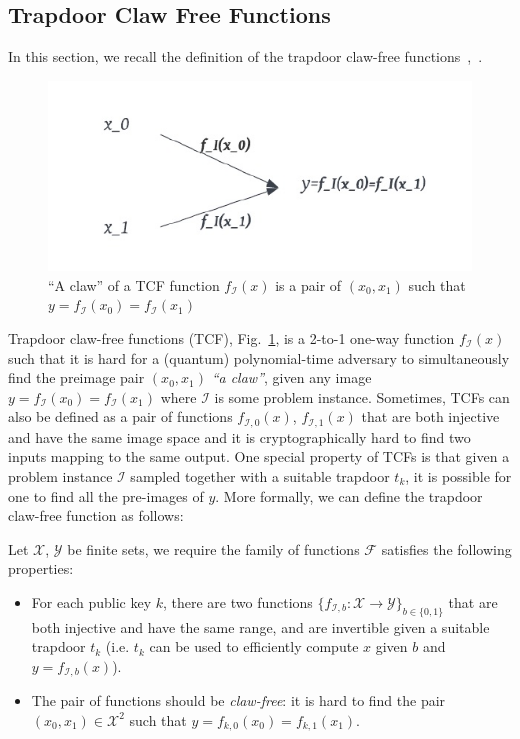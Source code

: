 \documentclass[cryptography,review,submit,pdftex,moreauthors,amsmath,amssymb,aps,strict]{Definitions/mdpi}
\begin{document}
\subsection{Trapdoor Claw Free Functions}

In this section, we recall the definition of the trapdoor claw-free functions~\cite{GRM85},~\cite{Brakerski18_Interactiveproofofquantumness}.

\begin{figure}[!htb]
	\centering
	\includegraphics[]{figures/TCF.pdf}
	\caption{``A claw'' of a TCF function $f_{\mathcal{I}}(x)$ is a pair of $(x_0,x_1)$ such that $y=f_{\mathcal{I}}(x_0)=f_{\mathcal{I}}(x_1)$}\label{fig:TCF}
\end{figure}


Trapdoor claw-free functions (TCF), Fig.~\ref{fig:TCF}, is a 2-to-1 one-way function $f_\mathcal{I}(x)$ such that it is hard for a (quantum) polynomial-time adversary to simultaneously find the preimage pair $(x_0,x_1)$ \textit{``a claw''}, given any image $y = f_{\mathcal{I}}(x_0)=f_{\mathcal{I}}(x_1)$ where $\mathcal{I}$ is some problem instance. Sometimes, TCFs can also be defined as a pair of functions $f_{\mathcal{I},0}(x)$, $f_{\mathcal{I},1}(x)$ that are both injective and have the same image space and it is cryptographically hard to find two inputs mapping to the same output. One special property of TCFs is that given a problem instance $\mathcal{I}$ sampled together with a suitable trapdoor $t_{k}$, it is possible for one to find all the pre-images of $y$. More formally, we can define the trapdoor claw-free function as follows:
\begin{Definition}
    Let $\mathcal{X}$, $\mathcal{Y}$ be finite sets, we require the family of functions $\mathcal{F}$ satisfies the following properties:
\begin{itemize}
    \item For each public key $k$, there are two functions $\{f_{\mathcal{I},b}:\mathcal{X}\to\mathcal{Y}\}_{b\in\{0,1\}}$ that are both injective and have the same range, and are invertible given a suitable trapdoor $t_k$ (i.e.  $t_k$ can be used to efficiently compute $x$ given $b$ and $y=f_{\mathcal{I},b}(x)$). 
    \item The pair of functions should be \textit{claw-free}: it is hard to find the pair $(x_0,x_1)\in\mathcal{X}^2$ such that $y=f_{k,0}(x_0)=f_{k,1}(x_1)$.
\end{itemize}
\end{Definition}
\end{document}

